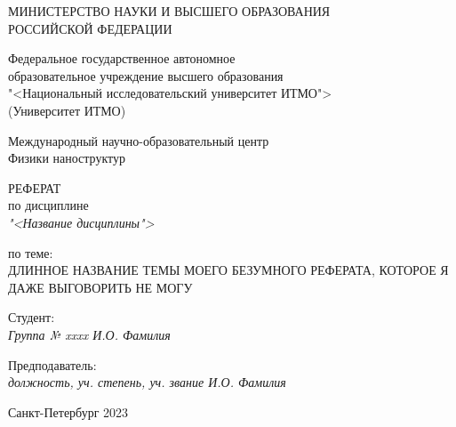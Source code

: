 \thispagestyle{empty}

\begin{center}
    МИНИСТЕРСТВО НАУКИ И ВЫСШЕГО ОБРАЗОВАНИЯ \\ РОССИЙСКОЙ ФЕДЕРАЦИИ

    \vspace{20pt}

    Федеральное государственное автономное \\ образовательное учреждение высшего образования \\
    "<Национальный исследовательский университет ИТМО"> \\
    (Университет ИТМО)

    \vspace{20pt}

    Международный научно-образовательный центр \\ Физики наноструктур
\end{center}

\vfill

\begin{center}
    РЕФЕРАТ \\  
    по дисциплине \\
    \textit{"<Название дисциплины">}

    \vspace{20pt}

    по теме: \\
    \uppercase{Длинное название темы моего безумного реферата, которое я даже выговорить не могу}
\end{center}

\vfill

    \noindent Студент: \\
    \textit{Группа № xxxx \hfill И.О. Фамилия}

    \vspace{20pt}

    \noindent Предподаватель: \\
    \textit{должность, уч. степень, уч. звание \hfill И.О. Фамилия}

\vfill

\begin{center}
    Санкт-Петербург 2023
\end{center}